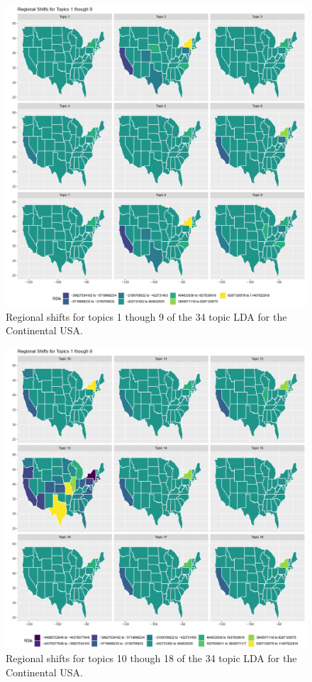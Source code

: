 \begin{figure}
	\centering
	\includegraphics[width=\linewidth]{Figures/ChapterV/States_01_09}
	\caption[Regional shifts using 34 Topic LDA, Topics 1 thought 9]{Regional shifts for topics 1 though 9 of the 34 topic LDA for the Continental USA.}
	\label{fig:shift-share_lda34-1-9}
\end{figure}

\begin{figure}
	\centering
	\includegraphics[width=\linewidth]{Figures/ChapterV/States_10_18}
	\caption[Regional shifts using 34 Topic LDA, Topics 10 thought 19]{Regional shifts for topics 10 though 18 of the 34 topic LDA for the Continental USA.}
	\label{fig:shift-share_lda34-10-18}
\end{figure}


